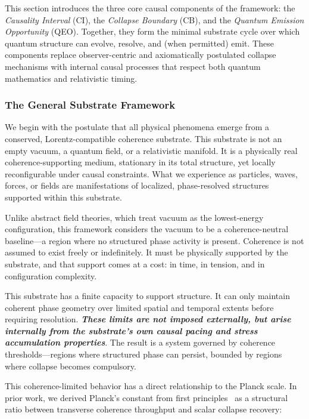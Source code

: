 \documentclass[preprints,article,submit,pdftex,moreauthors]{Definitions/mdpi}
\begin{document}
This section introduces the three core causal components of the framework: the \textit{Causality Interval} (CI), the \textit{Collapse Boundary} (CB), and the \textit{Quantum Emission Opportunity} (QEO). Together, they form the minimal substrate cycle over which quantum structure can evolve, resolve, and (when permitted) emit. These components replace observer-centric and axiomatically postulated collapse mechanisms with internal causal processes that respect both quantum mathematics and relativistic timing.

\subsubsection{The General Substrate Framework}

We begin with the postulate that all physical phenomena emerge from a conserved, Lorentz-compatible coherence substrate. This substrate is not an empty vacuum, a quantum field, or a relativistic manifold. It is a physically real coherence-supporting medium, stationary in its total structure, yet locally reconfigurable under causal constraints. What we experience as particles, waves, forces, or fields are manifestations of localized, phase-resolved structures supported within this substrate.

Unlike abstract field theories, which treat vacuum as the lowest-energy configuration, this framework considers the vacuum to be a coherence-neutral baseline—a region where no structured phase activity is present. Coherence is not assumed to exist freely or indefinitely. It must be physically supported by the substrate, and that support comes at a cost: in time, in tension, and in configuration complexity.

This substrate has a finite capacity to support structure. It can only maintain coherent phase geometry over limited spatial and temporal extents before requiring resolution. \textit{\textbf{These limits are not imposed externally, but arise internally from the substrate’s own causal pacing and stress accumulation properties}}. The result is a system governed by coherence thresholds—regions where structured phase can persist, bounded by regions where collapse becomes compulsory.

This coherence-limited behavior has a direct relationship to the Planck scale. In prior work, we derived Planck’s constant from first principles~\cite{bush-planck-2025} as a structural ratio between transverse coherence throughput and scalar collapse recovery:
\end{document}
